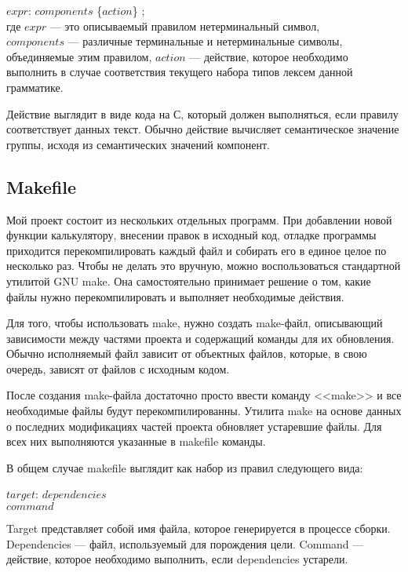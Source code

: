 \documentclass[bachelor, och, coursework, times]{SCWorks}
\begin{document}
$expr$: \quad $components$ \{$action$\} ; \\

где $expr$ --- это описываемый правилом нетерминальный символ,\\ $components$ --- различные терминальные и нетерминальные символы, объединяемые этим правилом, $action$ --- действие, которое необходимо выполнить в случае соответствия текущего набора типов лексем данной грамматике.

Действие выглядит в виде кода на С, который должен выполняться, если правилу соответствует данных текст. Обычно действие вычисляет семантическое значение группы, исходя из семантических значений компонент.~\cite{opennet}







\subsection{Makefile}

Мой проект состоит из нескольких отдельных программ. При добавлении новой функции калькулятору, внесении правок в исходный код, отладке программы приходится перекомпилировать каждый файл и собирать его в единое целое по несколько раз. Чтобы не делать это вручную, можно воспользоваться стандартной утилитой GNU make. Она самостоятельно принимает решение о том, какие файлы нужно перекомпилировать и выполняет необходимые действия.

Для того, чтобы использовать make, нужно создать make-файл, описывающий зависимости между частями проекта и содержащий команды для их обновления. Обычно исполняемый файл зависит от объектных файлов, которые, в свою очередь, зависят от файлов с исходным кодом.

После создания make-файла достаточно просто ввести команду <<make>> и все необходимые файлы будут перекомпилированны. Утилита make на основе данных о последних модификациях частей проекта обновляет устаревшие файлы. Для всех них выполняются указанные в makefile команды. ~\cite{make1}

В общем случае makefile выглядит как набор из правил следующего вида:

$target$: \quad $dependencies$ \\
$ $\quad \quad \quad \quad \quad \quad $command$

Target представляет собой имя файла, которое генерируется в процессе сборки. Dependencies --- файл, используемый для порождения цели. Command --- действие, которое необходимо выполнить, если dependencies устарели.
\end{document}
